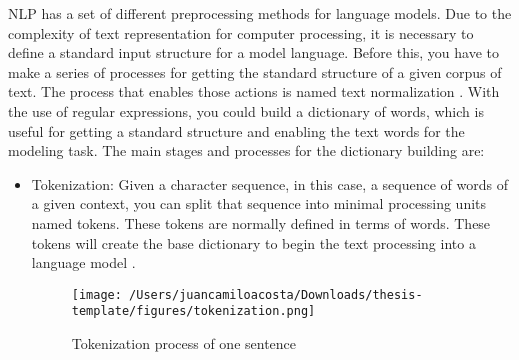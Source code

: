 NLP has a set of different preprocessing methods for language models. Due to the complexity of text representation for computer processing, it is necessary to define a standard input structure for a model language. Before this, you have to make a series of processes for getting the standard structure of a given corpus of text. The process that enables those actions is named text normalization \citet{nlp-fundamentals}. With the use of regular expressions, you could build a dictionary of words, which is useful for getting a standard structure and enabling the text words for the modeling task. The main stages and processes for the dictionary building are:

\begin{itemize}
    \item Tokenization: Given a character sequence, in this case, a sequence of words of a given context, you can split that sequence into minimal processing units named tokens. These tokens are normally defined in terms of words. These tokens will create the base dictionary to begin the text processing into a language model \citet{information-retrieval}. 

    \begin{figure}[H]
    \centering
    \texttt{[image: /Users/juancamiloacosta/Downloads/thesis-template/figures/tokenization.png]}
    \caption{Tokenization process of one sentence \citet{information-retrieval} }
    \label{fig:tokenization}
    \end{figure}
    

\end{itemize}

